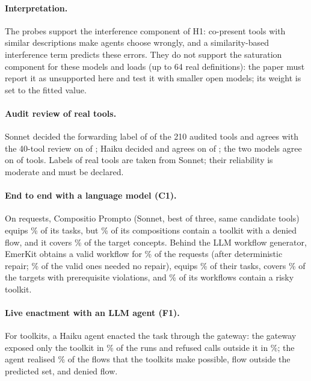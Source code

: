 \documentclass[10pt]{article}
\begin{document}
\paragraph{Interpretation.} The probes support the interference component of H1: co-present tools with similar descriptions make agents choose wrongly, and a similarity-based interference term predicts these errors. They do not support the saturation component for these models and loads (up to 64 real definitions): the paper must report it as unsupported here and test it with smaller open models; its weight is set to the fitted value.

\paragraph{Audit review of real tools.} Sonnet decided the forwarding label of \RAuSonnetDec{} of the 210 audited tools and agrees with the 40-tool review on \RAuSonnetAgree{} of \RAuSonnetN; Haiku decided \RAuHaikuDec{} and agrees on \RAuHaikuAgree{} of \RAuHaikuN; the two models agree on \RAuPair{} of \RAuPairN{} tools. Labels of real tools are taken from Sonnet; their reliability is moderate and must be declared.

\paragraph{End to end with a language model (C1).} On \RCoN{} requests, Compositio Prompto (Sonnet, best of three, same candidate tools) equips \RCoCpEq\% of its tasks, but \RCoCpRisk\% of its compositions contain a toolkit with a denied flow, and it covers \RCoCpObj\% of the target concepts. Behind the LLM workflow generator, EmerKit obtains a valid workflow for \RCoLgValid\% of the requests (after deterministic repair; \RCoLgRaw\% of the valid ones needed no repair), equips \RCoLgEq\% of their tasks, covers \RCoLgObj\% of the targets with \RCoLgPrereq{} prerequisite violations, and \RCoLgRisk\% of its workflows contain a risky toolkit.

\paragraph{Live enactment with an LLM agent (F1).} For \RFlN{} toolkits, a Haiku agent enacted the task through the gateway: the gateway exposed only the toolkit in \RFlExposed\% of the runs and refused calls outside it in \RFlBlocked\%; the agent realised \RFlRealised\% of the flows that the toolkits make possible, \RFlUnexp{} flow outside the predicted set, and \RFlDenied{} denied flow.
\end{document}
